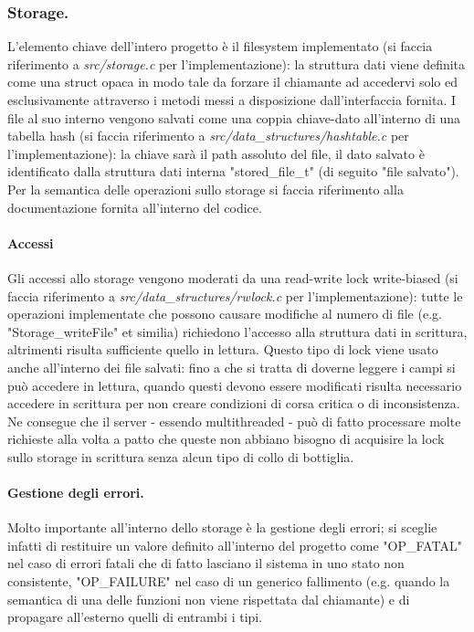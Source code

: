 \documentclass[11pt, italian, openany]{book}
\begin{document}
\begin{sloppypar}
\subsubsection{Storage.}
L'elemento chiave dell'intero progetto \`e il filesystem implementato (si faccia riferimento a \textit{src/storage.c} per l'implementazione): la struttura dati viene
definita come una struct opaca in modo tale da forzare il chiamante ad accedervi solo ed esclusivamente attraverso i metodi
messi a disposizione dall'interfaccia fornita. I file al suo interno vengono salvati come una coppia chiave-dato all'interno di
una tabella hash (si faccia riferimento a \textit{src/data\_structures/hashtable.c} per l'implementazione): la chiave sar\`a il path assoluto del
file, il dato salvato \`e identificato dalla struttura dati interna "stored\_file\_t" (di seguito "file salvato").
Per la semantica delle operazioni sullo storage si faccia riferimento alla documentazione fornita all'interno del codice.

\paragraph*{Accessi}
Gli accessi allo storage vengono moderati da una read-write lock write-biased (si faccia riferimento a \textit{src/data\_structures/rwlock.c}
per l'implementazione): tutte le operazioni implementate che possono causare modifiche al numero di file
(e.g. "Storage\_writeFile" et similia) richiedono l'accesso alla struttura dati in scrittura, altrimenti risulta sufficiente
quello in lettura. Questo tipo di lock viene usato anche all'interno dei file salvati: fino a che si tratta di doverne leggere i campi si pu\`o
accedere in lettura, quando questi devono essere modificati risulta necessario accedere in scrittura per non creare condizioni
di corsa critica o di inconsistenza. Ne consegue che il server - essendo multithreaded - pu\`o di fatto processare molte richieste
alla volta a patto che queste non abbiano bisogno di acquisire la lock sullo storage in scrittura senza alcun tipo di collo di
bottiglia.

\paragraph{Gestione degli errori.}

Molto importante all'interno dello storage \`e la gestione degli errori; si sceglie infatti di restituire un valore
definito all'interno del progetto come "OP\_FATAL" nel caso di errori fatali che di fatto lasciano il sistema in uno stato
non consistente, "OP\_FAILURE" nel caso di un generico fallimento (e.g. quando la semantica di una delle funzioni non viene rispettata
dal chiamante) e di propagare all'esterno quelli di entrambi i tipi.


\end{sloppypar}
\end{document}
